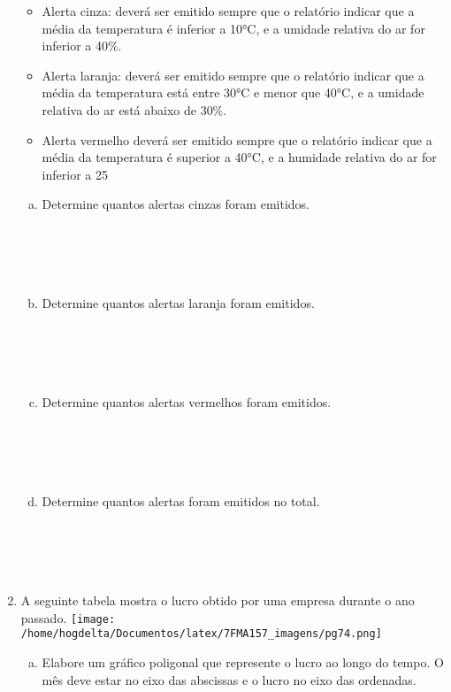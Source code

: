 \documentclass[a4paper,14pt]{article}
\begin{document}
\begin{multicols}{2}
\begin{enumerate}
			\begin{itemize}
				\item Alerta cinza: deverá ser emitido sempre que o relatório indicar que a média da temperatura é inferior a 10°C, e a umidade relativa do ar for inferior a 40\%.
				\item Alerta laranja: deverá ser emitido sempre que o relatório indicar que a média da temperatura está entre 30°C e menor que 40°C, e a umidade relativa do ar está abaixo de 30\%.
				\item Alerta vermelho deverá ser emitido sempre que o relatório indicar que a média da temperatura é superior a 40°C, e a humidade relativa do ar for inferior a 25%
			\end{itemize}
		    \begin{enumerate}[a)]
		    	\item Determine quantos alertas cinzas foram emitidos.\\\\\\\\\\
		    	\item Determine quantos alertas laranja foram emitidos.\\\\\\\\\\
		    	\item Determine quantos alertas vermelhos foram emitidos.\\\\\\\\\\
		    	\item Determine quantos alertas foram emitidos no total.\\\\\\\\\\
		    \end{enumerate}
			\item A seguinte tabela mostra o lucro obtido por uma empresa durante o ano passado.
			\texttt{[image: /home/hogdelta/Documentos/latex/7FMA157\_imagens/pg74.png]} \\
			\begin{enumerate}[a)]
				\item Elabore um gráfico poligonal que represente o lucro ao longo do tempo. O mês deve estar no eixo das abscissas e o lucro no eixo das ordenadas. \\\\\\\\\\

\end{enumerate}
\end{enumerate}
\end{multicols}
\end{document}
